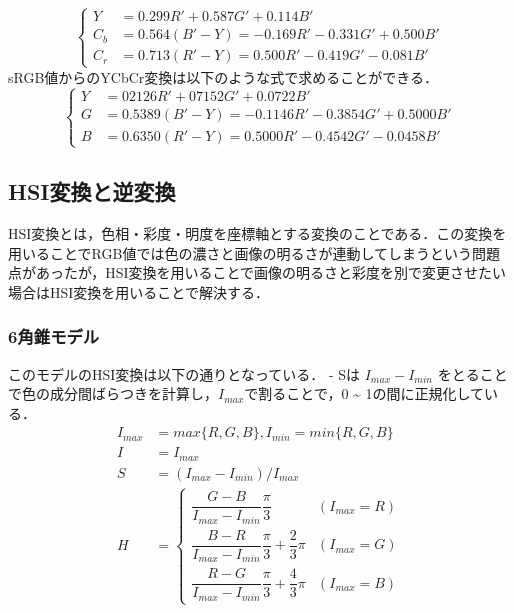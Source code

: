 \documentclass[
]{article}
\begin{document}
\begin{equation}
\begin{cases}
Y &= 0.299R' + 0.587G' + 0.114B' \\
C_b &= 0.564(B' - Y) = -0.169R' - 0.331G' + 0.500B' \\
C_r &= 0.713(R' - Y) = 0.500R' - 0.419G' -0.081B'
\end{cases}
\end{equation}
 sRGB値からのYCbCr変換は以下のような式で求めることができる．
\begin{equation}
\begin{cases}
Y &= 02126R' + 07152G' + 0.0722B' \\
G &= 0.5389(B' - Y) = -0.1146R' - 0.3854G' + 0.5000B' \\
B &= 0.6350(R' - Y) = 0.5000R' - 0.4542G' - 0.0458B'
\end{cases}
\end{equation}

\subsection{HSI変換と逆変換}
HSI変換とは，色相・彩度・明度を座標軸とする変換のことである．この変換を用いることでRGB値では色の濃さと画像の明るさが連動してしまうという問題点があったが，HSI変換を用いることで画像の明るさと彩度を別で変更させたい場合はHSI変換を用いることで解決する．

\hypertarget{ux89d2ux9310ux30e2ux30c7ux30eb}{%
\subsubsection{6角錐モデル}\label{ux89d2ux9310ux30e2ux30c7ux30eb}}

このモデルのHSI変換は以下の通りとなっている． - Sは
\(I_{max} - I_{min}\)
をとることで色の成分間ばらつきを計算し，\(I_{max}\)で割ることで，0
\textasciitilde{} 1の間に正規化している． 
\begin{equation}
\begin{aligned}
I_{max} &= max\{R, G, B\}, I_{min} = min\{R, G, B\} \\
I &= I_{max} \\
S &= (I_{max} - I_{min}) / I_{max} \\
H &= 
\begin{cases}
\dfrac{G - B}{I_{max} - I_{min}}\dfrac{\pi}{3} & (I_{max} = R) \\
\dfrac{B - R}{I_{max} - I_{min}}\dfrac{\pi}{3} + \dfrac{2}{3}\pi & (I_{max} = G) \\
\dfrac{R - G}{I_{max} - I_{min}}\dfrac{\pi}{3} + \dfrac{4}{3}\pi & (I_{max} = B)
\end{cases}
\end{aligned}
\end{equation}
\end{document}
